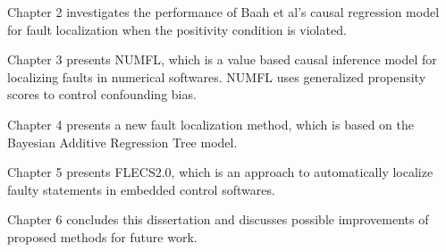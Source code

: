 Chapter 2 investigates the performance of Baah et al’s causal regression model for fault localization when the positivity condition is violated.

Chapter 3 presents NUMFL, which is a value based causal inference model for localizing faults in numerical softwares. NUMFL uses generalized propensity scores to control confounding bias.

Chapter 4 presents a new fault localization method, which is based on  the Bayesian Additive Regression Tree model.

Chapter 5 presents FLECS2.0, which is an approach to automatically localize faulty statements in embedded control softwares.

Chapter 6 concludes this dissertation and discusses possible improvements of proposed methods for future work.



